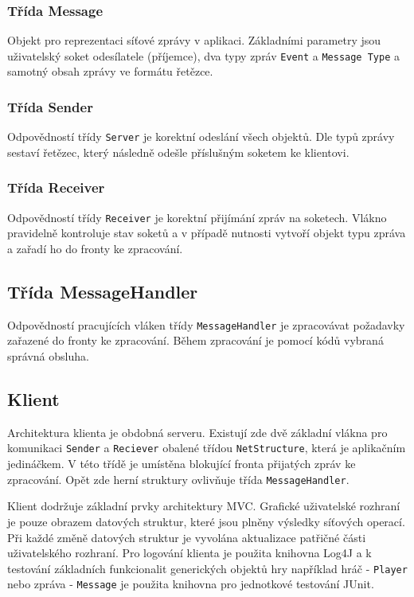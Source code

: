 \documentclass[12pt, a4paper]{article}
\begin{document}
\subsubsection{Třída Message}
Objekt pro reprezentaci síťové zprávy v aplikaci. Základními parametry jsou uživatelský soket odesílatele (příjemce), dva typy zpráv \texttt{Event} a \texttt{Message Type} a samotný obsah zprávy ve formátu řetězce.

\subsubsection{Třída Sender}
Odpovědností třídy \texttt{Server} je korektní odeslání všech objektů. Dle typů zprávy sestaví řetězec, který následně odešle příslušným soketem ke klientovi.

\subsubsection{Třída Receiver}
Odpovědností třídy \texttt{Receiver} je korektní přijímání zpráv na soketech. Vlákno pravidelně kontroluje stav soketů a v případě nutnosti vytvoří objekt typu zpráva a zařadí ho do fronty ke zpracování. 

\subsection{Třída MessageHandler}
Odpovědností pracujících vláken třídy \texttt{MessageHandler} je zpracovávat požadavky zařazené do fronty ke zpracování. Během zpracování je pomocí kódů vybraná správná obsluha.


\subsection{Klient}

Architektura klienta je obdobná serveru. Existují zde dvě základní vlákna pro komunikaci \texttt{Sender} a \texttt{Reciever} obalené třídou \texttt{NetStructure}, která je aplikačním jedináčkem. V této třídě je umístěna blokující fronta přijatých zpráv ke zpracování. Opět zde herní struktury ovlivňuje třída \texttt{MessageHandler}.

Klient dodržuje základní prvky architektury MVC. Grafické uživatelské rozhraní je pouze obrazem datových struktur, které jsou plněny výsledky síťových operací. Při každé změně datových struktur je vyvolána aktualizace patřičné části uživatelského rozhraní. Pro logování klienta je použita knihovna Log4J a k testování základních funkcionalit generických objektů hry například hráč - \texttt{Player} nebo zpráva - \texttt{Message} je použita knihovna pro jednotkové testování JUnit.
\end{document}

